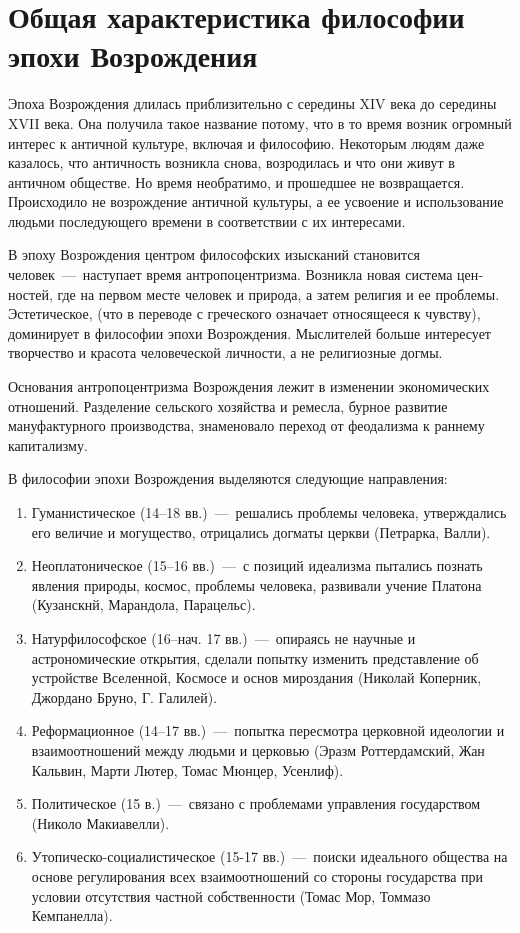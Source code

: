 \documentclass[14pt]{extarticle}
\begin{document}
\title{}
\maketitle

\section{Общая характеристика философии эпохи Возрождения}

Эпоха Возрождения длилась приблизительно с середины XIV века до середины XVII века. Она получила такое название потому, что в то время возник огромный интерес к античной культуре, включая и философию. Некоторым людям даже казалось, что античность возникла снова, возродилась и что они живут в античном обществе. Но время необратимо, и прошедшее не возвращается. Происходило не возрождение античной культуры, а ее усвоение и использование людьми последующего времени в соответствии с их интересами.

В эпоху Возрождения центром философских изы­сканий становится человек~---~наступает вре­мя антропоцентризма. Возникла новая система цен­ностей, где на первом месте человек и природа, а затем религия и ее проблемы. Эстетическое, (что в переводе с греческого озна­чает относящееся к чувству), доминирует в филосо­фии эпохи Возрождения. Мыслителей больше инте­ресует творчество и красота человеческой личности, а не религиозные догмы. 

Основания антропоцен­тризма Возрождения лежит в изменении экономиче­ских отношений. Разделение сельского хозяйства и ремесла, бурное развитие мануфактурного производ­ства, знаменовало переход от феодализма к раннему капитализму.

В философии эпохи Возрождения выделяются следующие на­правления:

\begin{enumerate}
	\item Гуманистическое (14--18 вв.)~---~решались проблемы человека, утверждались его величие и могущество, отрицались догматы церкви (Петрарка, Валли).
	\item Неоплатоническое (15--16 вв.)~---~с позиций идеализ­ма пытались познать явления природы, космос, проблемы человека, развивали учение Платона (Кузанскнй, Марандола, Парацельс).
	\item Натурфилософское (16--нач. 17 вв.)~---~опираясь не научные и астрономические открытия, сделали по­пытку изменить представление об устройстве Все­ленной, Космосе и основ мироздания (Николай Ко­перник, Джордано Бруно, Г. Галилей).
	\item Реформационное (14--17 вв.)~---~попытка пересмотра церковной идеологии и взаимоотношений между людьми и церковью (Эразм Роттердамский, Жан Кальвин, Марти Лютер, Томас Мюнцер, Усенлиф).
	\item Политическое (15 в.)~---~связано с проблемами управления государством (Николо Макиавелли).
	\item Утопическо-социалистическое (15-17 вв.)~---~поиски идеального общества на основе регулирования всех взаимоотношений со стороны государства при условии отсутствия частной собственности (Томас Мор, Томмазо Кемпанелла).
\end{enumerate}
\end{document}
